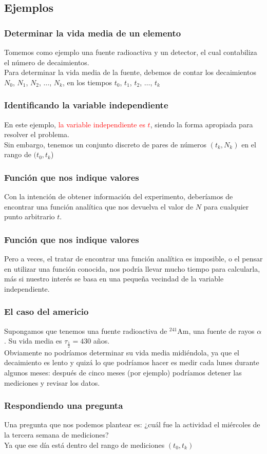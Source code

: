 \documentclass[12pt]{beamer}
\begin{document}
\subsection*{Ejemplos}

\begin{frame}
\frametitle{Determinar la vida media de un elemento}
Tomemos como ejemplo una fuente radioactiva y un detector, el cual contabiliza el número de decaimientos.
\\
\bigskip
\pause
Para determinar la vida media de la fuente, debemos de contar los decaimientos $N_{0}$, $N_{1}$, $N_{2}$, $\ldots$, $N_{k}$, en los tiempos $t_{0}$, $t_{1}$, $t_{2}$, $\ldots$, $t_{k}$
\end{frame}
\begin{frame}
\frametitle{Identificando la variable independiente}
En este ejemplo, \textcolor{red}{la variable independiente es $t$}, siendo la forma  apropiada para resolver el problema. 
\\
\bigskip
\pause
Sin embargo, tenemos un conjunto discreto de pares de números $(t_{k}, N_{k})$ en el rango de $(t_{0}, t_{k}$)
\end{frame}
\begin{frame}
\frametitle{Función que nos indique valores}
Con la intención de obtener información del experimento, deberíamos de encontrar una función analítica que nos devuelva el valor de $N$ para cualquier punto arbitrario $t$.
\end{frame}
\begin{frame}
\frametitle{Función que nos indique valores}
Pero a veces, el tratar de encontrar una función analítica es imposible, o el pensar en utilizar una función conocida, nos podría llevar mucho tiempo para calcularla, más si nuestro interés se basa en una pequeña vecindad de la variable independiente.
\end{frame}
\begin{frame}
\frametitle{El caso del americio}
Supongamos que tenemos una fuente radioactiva de {}$^{241}$Am, una fuente de rayos $\alpha$. Su vida media es $\tau_{\frac{1}{2}} = 430$ años.
\\
\bigskip
\pause
Obviamente no podríamos determinar su vida media midiéndola, ya que el decaimiento es lento y quizá lo que podríamos hacer es medir cada lunes durante algunos meses: después de cinco meses (por ejemplo) podríamos detener las mediciones y revisar los datos.
\end{frame}
\begin{frame}
\frametitle{Respondiendo una pregunta}
Una pregunta que nos podemos plantear es: ¿cuál fue la actividad el miércoles de la tercera semana de mediciones? 
\\
\bigskip
\pause
Ya que ese día está dentro del rango de mediciones $(t_{0}, t_{k})$
\end{frame}
\end{document}
